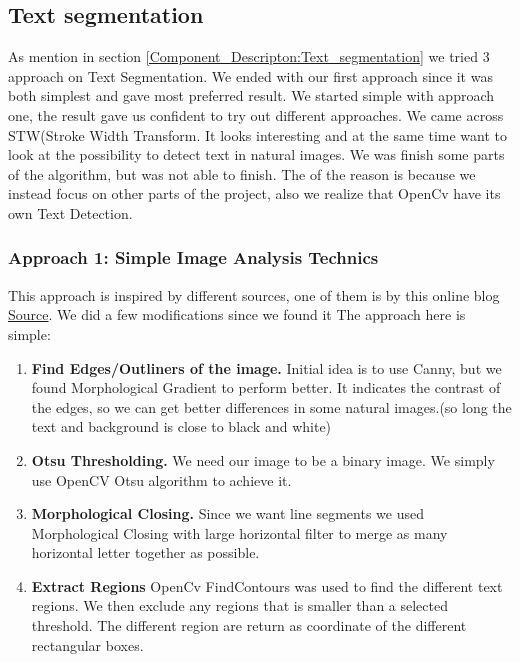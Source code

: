\documentclass[11pt,a4paper,UKenglish]{article}
\begin{document}
\subsection{Text segmentation}
As mention in section \ref{Component_Descripton:Text_segmentation} we tried 3 approach on Text Segmentation. We ended with our first approach since it was both simplest and gave most preferred result. We started simple with approach one, the result gave us confident to try out different approaches. We came across STW(Stroke Width Transform. It looks interesting and at the same time want to look at the possibility to detect text in natural images. We was finish some parts of the algorithm, but was not able to finish. The of the reason is because we instead focus on other parts of the project, also we realize that OpenCv have its own Text Detection.

\subsubsection{Approach 1: Simple Image Analysis Technics}
This approach is inspired by different sources, one of them is by this online blog \href{https://www.danvk.org/2015/01/07/finding-blocks-of-text-in-an-image-using-python-opencv-and-numpy.html}{Source}\cite{_finding_????}. We did a few modifications since we found it 
The approach here is simple: 
\begin{enumerate}
  \item \textbf{Find Edges/Outliners of the image.}
  Initial idea is to use Canny, but we found Morphological Gradient to perform better. It indicates the contrast of the edges, so we can get better differences in some natural images.(so long the text and background is close to black and white)
  \item \textbf{Otsu Thresholding.}
  We need our image to be a binary image. We simply use OpenCV Otsu algorithm to achieve it. 
  \item \textbf{Morphological Closing.}
  Since we want line segments we used Morphological Closing with large horizontal filter to merge as many horizontal letter together as possible. 
  \item \textbf{Extract Regions} 
  OpenCv FindContours was used to find the different text regions. We then exclude any regions that is smaller than a selected threshold. The different region are return as coordinate of the different rectangular boxes. 
\end{enumerate}
\end{document}
